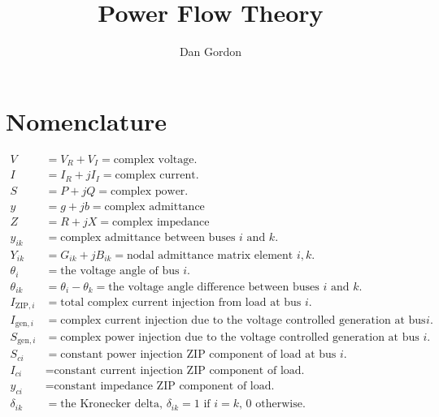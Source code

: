 \documentclass[11pt]{article}
\title{Power Flow Theory}
\author{Dan Gordon}
\date{}
\newcommand{\Vr}{{V_R}}
\newcommand{\Vi}{{V_I}}
\newcommand{\Ir}{{I_R}}
\newcommand{\Ii}{{I_I}}
\begin{document}
\maketitle

\section{Nomenclature}
\begin{align*}
V &= \Vr + \Vi = \text{complex voltage.} \\
I &= \Ir + j\Ii = \text{complex current.} \\
S &= P + jQ = \text{complex power.} \\
y &= g + jb = \text{complex admittance} \\
Z &= R + jX = \text{complex impedance} \\
y_{ik} &= \text{complex admittance between buses $i$ and $k$.} \\
Y_{ik} &= G_{ik} + jB_{ik} = \text{nodal admittance matrix element $i, k$.} \\
\theta_{i} &= \text{the voltage angle of bus $i$.} \\
\theta_{ik} &= \theta_i - \theta_k = \text{the voltage angle difference between buses $i$ and $k$.} \\
I_{\text{ZIP},i} &= \text{total complex current injection from load at bus $i$.} \\
I_{\text{gen},i} &= \text{complex current injection due to the voltage controlled generation at bus $i$.} \\
S_{\text{gen},i} &= \text{complex power injection due to the voltage controlled generation at bus $i$.} \\
S_{ci} &= \text{constant power injection ZIP component of load at bus $i$.} \\
I_{ci} &= \text{constant current injection ZIP component of load.} \\
y_{ci} &= \text{constant impedance ZIP component of load.} \\
\delta_{ik} &= \text{the Kronecker delta, $\delta_{ik} = 1$ if $i = k$, 0 otherwise.}
\end{align*}
\end{document}
